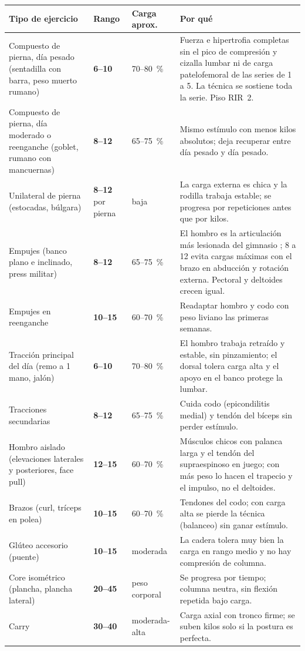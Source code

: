 \documentclass[11pt,a4paper]{article}
\newcommand{\rango}[1]{\textbf{#1}}
\newcommand{\seg}{\textquotedbl}
\begin{document}
\begin{longtable}{L{4.3cm} L{1.6cm} L{1.8cm} L{7.4cm}}
\toprule
\textbf{Tipo de ejercicio} & \textbf{Rango} & \textbf{Carga aprox.} & \textbf{Por qué} \\
\midrule
\endhead
Compuesto de pierna, día pesado (sentadilla con barra, peso muerto rumano) & \rango{6--10} & 70--80~\% & Fuerza e hipertrofia completas sin el pico de compresión y cizalla lumbar ni de carga patelofemoral de las series de 1 a 5. La técnica se sostiene toda la serie. Piso RIR~2. \\
Compuesto de pierna, día moderado o reenganche (goblet, rumano con mancuernas) & \rango{8--12} & 65--75~\% & Mismo estímulo con menos kilos absolutos; deja recuperar entre día pesado y día pesado. \\
Unilateral de pierna (estocadas, búlgara) & \rango{8--12} por pierna & baja & La carga externa es chica y la rodilla trabaja estable; se progresa por repeticiones antes que por kilos. \\
Empujes (banco plano e inclinado, press militar) & \rango{8--12} & 65--75~\% & El hombro es la articulación más lesionada del gimnasio \cite{kolber2010}; 8 a 12 evita cargas máximas con el brazo en abducción y rotación externa. Pectoral y deltoides crecen igual. \\
Empujes en reenganche & \rango{10--15} & 60--70~\% & Readaptar hombro y codo con peso liviano las primeras semanas. \\
Tracción principal del día (remo a 1 mano, jalón) & \rango{6--10} & 70--80~\% & El hombro trabaja retraído y estable, sin pinzamiento; el dorsal tolera carga alta y el apoyo en el banco protege la lumbar. \\
Tracciones secundarias & \rango{8--12} & 65--75~\% & Cuida codo (epicondilitis medial) y tendón del bíceps sin perder estímulo. \\
Hombro aislado (elevaciones laterales y posteriores, face pull) & \rango{12--15} & 60--70~\% & Músculos chicos con palanca larga y el tendón del supraespinoso en juego; con más peso lo hacen el trapecio y el impulso, no el deltoides. \\
Brazos (curl, tríceps en polea) & \rango{10--15} & 60--70~\% & Tendones del codo; con carga alta se pierde la técnica (balanceo) sin ganar estímulo. \\
Glúteo accesorio (puente) & \rango{10--15} & moderada & La cadera tolera muy bien la carga en rango medio y no hay compresión de columna. \\
Core isométrico (plancha, plancha lateral) & \rango{20--45\seg} & peso corporal & Se progresa por tiempo; columna neutra, sin flexión repetida bajo carga. \\
Carry & \rango{30--40\seg} & moderada-alta & Carga axial con tronco firme; se suben kilos solo si la postura es perfecta. \\
\bottomrule
\end{longtable}
\end{document}
